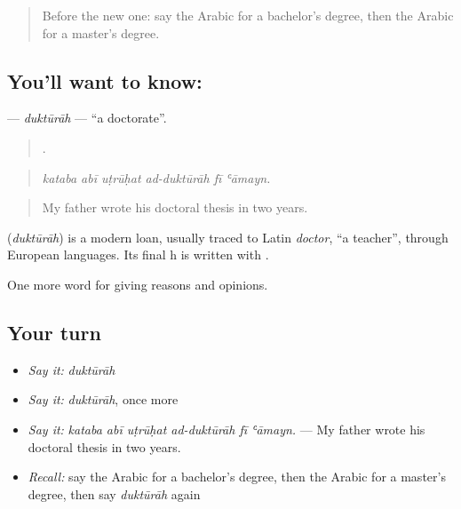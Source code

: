 \label{lesson:AR-C397-duktura}



\begin{quote}
Before the new one: say the Arabic for a bachelor's degree, then the Arabic for a master's degree.
\end{quote}

\subsection*{You'll want to know: }
\textbf{} — \emph{duktūrāh} — \textquotedblleft{}a doctorate\textquotedblright{}.

\begin{quote}
     .
\end{quote}

\begin{quote}
\emph{kataba abī uṭrūḥat ad-duktūrāh fī ʿāmayn.}
\end{quote}

\begin{quote}
My father wrote his doctoral thesis in two years.
\end{quote}

\begin{cousinweb}
\textbf{} (\emph{duktūrāh}) is a modern loan, usually traced to Latin \emph{doctor}, \textquotedblleft{}a teacher\textquotedblright{}, through European languages. Its final h is written with .
\end{cousinweb}

\begin{grammarlens}[title={What you've built}]
One more word for giving reasons and opinions.
\end{grammarlens}

\subsection*{Your turn}
\begin{itemize}
\raggedright
  \item \emph{Say it:} \emph{duktūrāh}
  \item \emph{Say it:} \emph{duktūrāh}, once more
  \item \emph{Say it:} \emph{kataba abī uṭrūḥat ad-duktūrāh fī ʿāmayn.} — My father wrote his doctoral thesis in two years.
  \item \emph{Recall:} say the Arabic for a bachelor's degree, then the Arabic for a master's degree, then say \emph{duktūrāh} again
\end{itemize}

